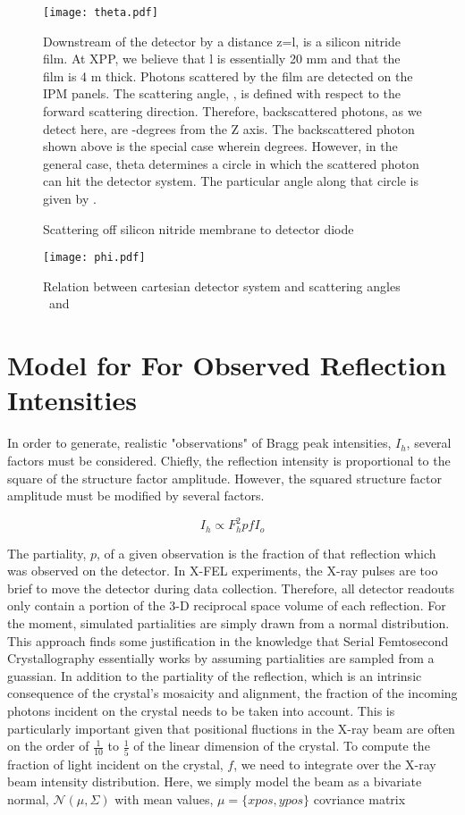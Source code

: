 \documentclass{report}
\begin{document}
\begin{figure}
\centering
\texttt{[image: theta.pdf]}
\caption{Scattering off silicon nitride membrane to detector diode}
Downstream of the detector by a distance z=l, is a silicon nitride film. 
At XPP, we believe that l is essentially 20 mm and that the film is 4 \textmu m thick. 
Photons scattered by the film are detected on the IPM panels. 
The scattering angle, \texttheta, is defined with respect to the forward scattering direction. 
Therefore, backscattered photons, as we detect here, are \textpi-\texttheta  degrees from the Z axis. 
The backscattered photon shown above is the special case wherein  degrees. 
However, in the general case, theta determines a circle in which the scattered photon can hit the detector system. 
The particular angle along that circle is given by \textphi. 
\end{figure}

\begin{figure}
\centering
\texttt{[image: phi.pdf]}
\caption{Relation between cartesian detector system and scattering angles \texttheta\ and \textphi}
\end{figure}

\section{Model for For Observed Reflection Intensities}
In order to generate, realistic "observations" of Bragg peak intensities, $I_h$, several factors must be considered. 
Chiefly, the reflection intensity is proportional to the square of the structure factor amplitude. 
However, the squared structure factor amplitude must be modified by several factors. 

\begin{equation}
I_h \propto F_h^2pfI_o
\end{equation}

The partiality, $p$, of a given observation is the fraction of that reflection which was observed on the detector. 
In X-FEL experiments, the X-ray pulses are too brief to move the detector during data collection. 
Therefore, all detector readouts only contain a portion of the 3-D reciprocal space volume of each reflection. 
For the moment, simulated partialities are simply drawn from a normal distribution. 
This approach finds some justification in the knowledge that Serial Femtosecond Crystallography essentially works by assuming partialities are sampled from a guassian. 
In addition to the partiality of the reflection, which is an intrinsic consequence of the crystal's mosaicity and alignment, the fraction of the incoming photons incident on the crystal needs to be taken into account. 
This is particularly important given that positional fluctions in the X-ray beam are often on the order of $\frac {1} {10}$ to $\frac {1} {5}$ of the linear dimension of the crystal. 
To compute the fraction of light incident on the crystal, $f$, we need to integrate over the X-ray beam intensity distribution. 
Here, we simply model the beam as a bivariate normal, $\mathcal{N}(\mu, \Sigma)$ with mean values, $\mu=\{xpos, ypos\}$ covriance matrix
\end{document}
